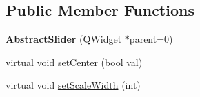 \subsection*{Public Member Functions}
\begin{DoxyCompactItemize}
\item 
\mbox{\label{class_awl_1_1_abstract_slider_a2895a774bdef448b07bad6cd1a73389a}} 
{\bfseries Abstract\+Slider} (Q\+Widget $\ast$parent=0)
\item 
virtual void \hyperlink{class_awl_1_1_abstract_slider_a4d634a84730200db18c9d7fe3873a993}{set\+Center} (bool val)
\item 
\mbox{\label{class_awl_1_1_abstract_slider_ad3096f06a83ebab7771c1230c0874458}} 
virtual void \hyperlink{class_awl_1_1_abstract_slider_ad3096f06a83ebab7771c1230c0874458}{set\+Scale\+Width} (int)
\begin{DoxyCompactList}\small\item\em 


\end{DoxyCompactList}
\end{DoxyCompactItemize}
